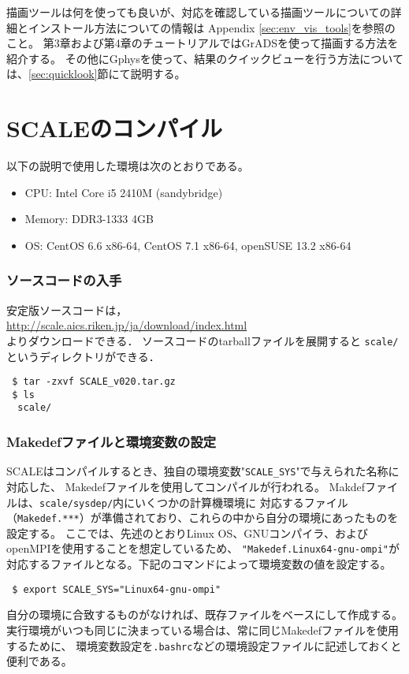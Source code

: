 描画ツールは何を使っても良いが、対応を確認している描画ツールについての詳細とインストール方法についての情報は
Appendix \ref{sec:env_vis_tools}を参照のこと。
第3章および第4章のチュートリアルではGrADSを使って描画する方法を紹介する。
その他にGphysを使って、結果のクイックビューを行う方法については、\ref{sec:quicklook}節にて説明する。



\section{SCALEのコンパイル} \label{sec:source_code}


以下の説明で使用した環境は次のとおりである。
\begin{itemize}
\item CPU: Intel Core i5 2410M (sandybridge)
\item Memory: DDR3-1333 4GB
\item OS: CentOS 6.6 x86-64, CentOS 7.1 x86-64, openSUSE 13.2 x86-64
\end{itemize}

\subsubsection{ソースコードの入手}
安定版ソースコードは，\\
 \url{http://scale.aics.riken.jp/ja/download/index.html}\\
よりダウンロードできる．
ソースコードのtarballファイルを展開すると
\verb|scale/|というディレクトリができる．
\begin{verbatim}
 $ tar -zxvf SCALE_v020.tar.gz
 $ ls
  scale/
\end{verbatim}



\subsubsection{Makedefファイルと環境変数の設定}

SCALEはコンパイルするとき、独自の環境変数"\verb|SCALE_SYS|"で与えられた名称に対応した、
Makedefファイルを使用してコンパイルが行われる。
Makdefファイルは、\verb|scale/sysdep/|内にいくつかの計算機環境に
対応するファイル（\verb|Makedef.***|）が準備されており、これらの中から自分の環境にあったものを設定する。
ここでは、先述のとおりLinux OS、GNUコンパイラ、およびopenMPIを使用することを想定しているため、
\verb|"Makedef.Linux64-gnu-ompi"|が対応するファイルとなる。下記のコマンドによって環境変数の値を設定する。
\begin{verbatim}
 $ export SCALE_SYS="Linux64-gnu-ompi"
\end{verbatim}
自分の環境に合致するものがなければ、既存ファイルをベースにして作成する。
実行環境がいつも同じに決まっている場合は、常に同じMakedefファイルを使用するために、
環境変数設定を\verb|.bashrc|などの環境設定ファイルに記述しておくと便利である。\\



